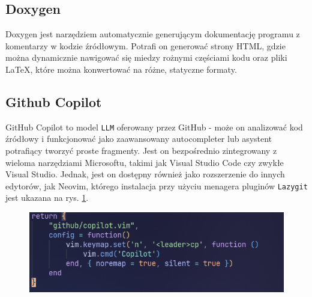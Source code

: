 \subsection{Doxygen}
Doxygen\cite{doxygensite} jest narzędziem automatycznie generującym dokumentację programu z komentarzy w kodzie źródłowym. Potrafi on generować strony HTML, gdzie można dynamicznie nawigować się miedzy rożnymi częściami kodu oraz pliki \LaTeX, które można konwertować na różne, statyczne formaty.

\subsection{Github Copilot}

GitHub Copilot\cite{copilotsite} to model \texttt{LLM} oferowany przez GitHub - może on analizować kod źródłowy i funkcjonować jako zaawansowany autocompleter lub asystent potrafiący tworzyć proste fragmenty. Jest on bezpośrednio zintegrowany z wieloma narzędziami Microsoftu, takimi jak Visual Studio Code czy zwykłe Visual Studio. Jednak, jest on dostępny również jako rozszerzenie do innych edytorów, jak Neovim, którego instalacja przy użyciu menagera pluginów \texttt{Lazygit} jest ukazana na rys. \ref{fig:copilot_install}.

\begin{figure}[H]
	\centering
	\includegraphics[width=1\textwidth]{images/copilot-plugin.png}
	\caption{}
	\label{fig:copilot_install}
\end{figure}
